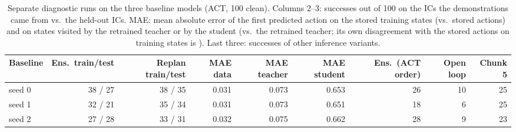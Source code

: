 \begin{table}[t]
\centering
\scriptsize
\begin{adjustbox}{max width=\linewidth}
\begin{tabular}{lrrrrrrrr}
\toprule
Baseline & Ens.\ train/test & Replan train/test & MAE data & MAE teacher & MAE student & Ens.\ (ACT order) & Open loop & Chunk 5 \\
\midrule
seed 0 & 38 / 27 & 38 / 35 & 0.031 & 0.073 & 0.653 & 26 & 10 & 25 \\
seed 1 & 32 / 21 & 35 / 34 & 0.031 & 0.073 & 0.651 & 18 & 6 & 25 \\
seed 2 & 27 / 28 & 33 / 31 & 0.032 & 0.075 & 0.662 & 28 & 9 & 23 \\
\bottomrule
\end{tabular}
\end{adjustbox}
\caption{Separate diagnostic runs on the three baseline models (ACT, 100 clean). Columns 2--3: successes out of 100 on the ICs the demonstrations came from vs.\ the held-out ICs. MAE: mean absolute error of the first predicted action on the stored training states (vs.\ stored actions) and on states visited by the retrained teacher or by the student (vs.\ the retrained teacher; its own disagreement with the stored actions on training states is \diagTeacherFloor). Last three: successes of other inference variants.}
\label{tab:diag}
\end{table}
